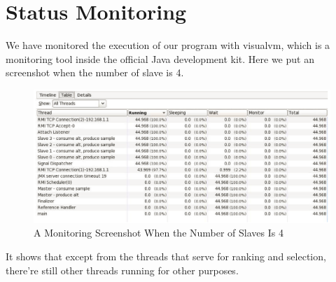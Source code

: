 \chapter{Status Monitoring}

We have monitored the execution of our program with visualvm, which is a monitoring tool inside the official Java development kit. Here we put an screenshot when the number of slave is 4.

\begin{figure}[ht]
\centering
\includegraphics[width=128mm]{monitor.png}
\caption{A Monitoring Screenshot When the Number of Slaves Is 4}
\end{figure}

It shows that except from the threads that serve for ranking and selection, there're still other threads running for other purposes.
